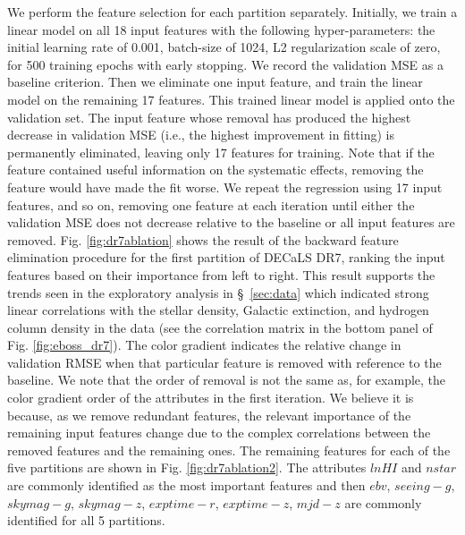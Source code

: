 \documentclass[fleqn, usenatbib]{mnras}
\begin{document}
We perform the feature selection for each partition separately. Initially, we train a linear model on all 18 input features with the following hyper-parameters: the initial learning rate of 0.001, batch-size of 1024, L2 regularization scale of zero, for 500 training epochs with early stopping. We record the validation MSE as a baseline criterion. Then we eliminate one input feature, and train the linear model on the remaining 17 features. This trained linear model is applied onto the validation set. The input feature whose removal has produced the highest decrease in validation MSE (i.e., the highest improvement in fitting) is permanently eliminated, leaving only 17 features for training. Note that if the feature contained useful information on the systematic effects, removing the feature would have made the fit worse. We repeat the regression using 17 input features, and so on, removing one feature at each iteration until either the validation MSE does not decrease relative to the baseline or all input features are removed. Fig. \ref{fig:dr7ablation} shows the result of the backward feature elimination procedure for the first partition of DECaLS DR7, ranking the input features based on their importance from left to right. This result supports the trends seen in the exploratory analysis in \S~\ref{sec:data} which indicated strong linear correlations with the stellar density, Galactic extinction, and hydrogen column density in the data (see the correlation matrix in the bottom panel of Fig. \ref{fig:eboss_dr7}). The color gradient indicates the relative change in validation RMSE when that particular feature is removed with reference to the baseline. We note that the order of removal is not the same as, for example, the color gradient order of the attributes in the first iteration. We believe it is because, as we remove redundant features, the relevant importance of the remaining input features change due to the complex correlations between the removed features and the remaining ones. The remaining features for each of the five partitions are shown in Fig. \ref{fig:dr7ablation2}. The attributes $lnHI$ and $nstar$ are commonly identified as the most important features and then $ebv$, $seeing-g$, $skymag-g$, $skymag-z$, $exptime-r$, $exptime-z$, $mjd-z$ are commonly identified for all 5 partitions.\\
\end{document}
